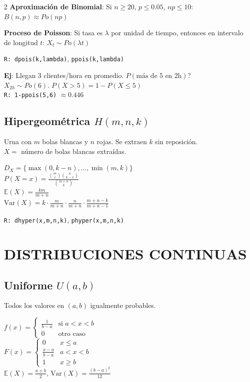 \documentclass[9pt,a4paper]{article}
\newcommand{\E}{\mathbb{E}}
\newcommand{\Var}{\text{Var}}
\newcommand{\R}{\texttt{R: }}
\begin{document}
\begin{multicols}{2}
\textbf{Aproximación de Binomial}: Si $n\geq 20$, $p\leq 0.05$, $np\leq 10$:\\
$B(n,p)\approx Po(np)$

\textbf{Proceso de Poisson}: Si tasa es $\lambda$ por unidad de tiempo, entonces en intervalo de longitud $t$: $X_t\sim Po(\lambda t)$

\R\texttt{dpois(k,lambda)}, \texttt{ppois(k,lambda)}

\begin{exbox}
\textbf{Ej}: Llegan 3 clientes/hora en promedio. $P(\text{más de 5 en 2h})$?\\
$X_{2h}\sim Po(6)$. $P(X>5)=1-P(X\leq 5)$\\
\R \texttt{1-ppois(5,6)} $\approx 0.446$
\end{exbox}

\subsection{Hipergeométrica $H(m,n,k)$}
Urna con $m$ bolas blancas y $n$ rojas. Se extraen $k$ sin reposición.\\
$X=$ número de bolas blancas extraídas.
\begin{formulabox}
$D_X=\{\max(0,k-n),\ldots,\min(m,k)\}$\\
$P(X=x)=\frac{\binom{m}{x}\binom{n}{k-x}}{\binom{m+n}{k}}$\\
$\E(X)=\frac{km}{m+n}$\\
$\Var(X)=k\cdot\frac{m}{m+n}\cdot\frac{n}{m+n}\cdot\frac{m+n-k}{m+n-1}$
\end{formulabox}

\R\texttt{dhyper(x,m,n,k)}, \texttt{phyper(x,m,n,k)}

\section{DISTRIBUCIONES CONTINUAS}

\subsection{Uniforme $U(a,b)$}
Todos los valores en $(a,b)$ igualmente probables.
\begin{formulabox}
$f(x)=\begin{cases}\frac{1}{b-a} & \text{si }a<x<b\\0 & \text{otro caso}\end{cases}$\\[5pt]
$F(x)=\begin{cases}0 & x\leq a\\\frac{x-a}{b-a} & a<x<b\\1 & x\geq b\end{cases}$\\[5pt]
$\E(X)=\frac{a+b}{2}$, \quad $\Var(X)=\frac{(b-a)^2}{12}$
\end{formulabox}


\end{multicols}
\end{document}
